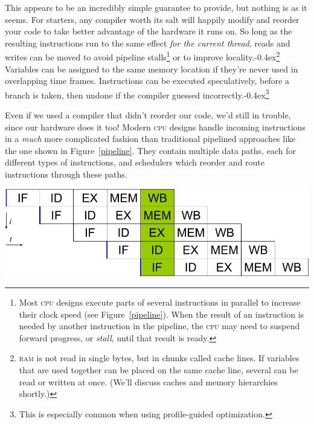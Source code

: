 \documentclass[fontsize=10pt, numbers=endperiod]{scrartcl}
\newcommand{\punckern}{\kern-0.4ex}
\newcommand{\cpp}[1]{C\kern-0.1ex\raisebox{0.15ex}{\texttt{++}}{\addfontfeature{Numbers=LowercaseOff}#1}}
\newcommand{\fig}[1]{Figure~\ref{#1}}
\newcommand{\introduce}[1]{\textit{#1}}
\newenvironment{colfigure}
  {\par\vspace{1\baselineskip minus 0.5\baselineskip}\noindent\minipage{\linewidth}}
  {\endminipage\vspace*{1\baselineskip minus 0.7\baselineskip}}
\begin{document}
\begin{multicols*}{2}
This appears to be an incredibly simple guarantee to provide,
but nothing is as it seems.
For starters, any compiler worth its salt will
happily modify and reorder your code to take better advantage of the hardware
it runs on.
So long as the resulting instructions run to the same effect
\emph{for the current thread},
reads and writes can be moved to avoid pipeline stalls\footnote{%
Most \textsc{cpu} designs execute parts of several instructions in parallel
to increase their clock speed (see \fig{pipeline}).
When the result of an instruction is needed by
another instruction in the pipeline, the \textsc{cpu} may need
to suspend forward progress, or \introduce{stall}, until that result is ready.}
or to improve locality.\punckern\footnote{%
\textsc{ram} is not read in single bytes, but in chunks called cache lines.
If variables that are used together can be placed on the same cache line,
several can be read or written at once.
(We'll discuss caches and memory hierarchies shortly.)}
Variables can be assigned to the same memory location if they're never used
in overlapping time frames.
Instructions can be executed speculatively, before a branch is taken,
then undone if the compiler guessed incorrectly.\punckern\footnote{This is
especially common when using profile-guided optimization.}

Even if we used a compiler that didn't reorder our code,
we'd still in trouble, since our hardware does it too!
Modern \textsc{cpu} designs handle incoming instructions in
a \emph{much} more complicated fashion than traditional pipelined approaches
like the one shown in \fig{pipeline}.
They contain multiple data paths, each for different types of instructions,
and schedulers which reorder and route instructions through these paths.
\begin{colfigure}
\centering
\includegraphics[keepaspectratio,width=0.7\linewidth]{pipeline}
\label{pipeline}
\end{colfigure}


\end{multicols*}
\end{document}
